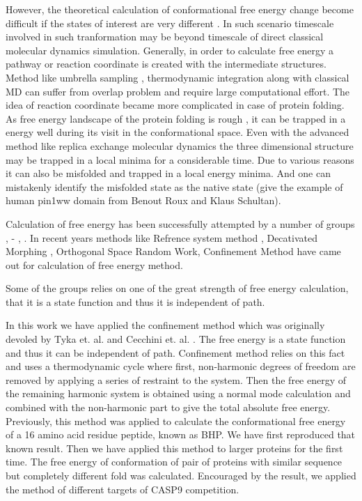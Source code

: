 \documentclass[12pt]{article}
\begin{document}
However, the theoretical calculation of conformational free energy change become difficult if the
states of interest are very different \cite{Meirovitch2007}. In such scenario timescale involved in such tranformation may
be beyond timescale of direct classical molecular dynamics simulation.  Generally, in order to
calculate free energy a pathway or reaction coordinate is created with the intermediate structures.
Method like umbrella sampling \cite{Torrie1977}, thermodynamic integration \cite{Tironi1994} along with classical MD can suffer from
overlap problem and require large computational effort. The idea of reaction coordinate became more
complicated in case of protein folding.  As free energy landscape of the protein folding 
is rough \cite{Dill1997}, \cite{Dill2008}
it can be trapped in a energy well during its visit in the conformational space. Even with the
advanced method like replica exchange molecular dynamics the three dimensional structure may be
trapped in a local minima for a considerable time. Due to various reasons it can also be misfolded
and trapped in a local energy minima. And one can mistakenly identify the misfolded state as the
native state (give the example of human pin1ww domain from Benout Roux and Klaus Schultan).


Calculation of free energy has been successfully attempted by a number of groups \cite{Meirovitch2007}, 
\cite{Ytreberg2006} - \cite{Zheng2008}, . In recent years methods like Refrence system method \cite{Ytreberg2006}, 
Decativated Morphing \cite{Park2008}, Orthogonal Space Random 
Work, Confinement Method have came out for calculation of free energy method. 

Some of the groups
relies on one of the great strength of free energy calculation, that it is a state function and thus
it is independent of path.

In this work we have applied the confinement method which was originally devoled by Tyka et. al. \cite{Tyka2006} and
Cecchini et. al. \cite{Cecchini2009}. The free energy is a state function and thus it can be independent of path. 
Confinement method relies on this fact and uses a thermodynamic cycle where first, non-harmonic degrees of
freedom are removed by applying a series of restraint to the system. Then the free energy of the
remaining harmonic system is obtained using a normal mode calculation and combined with the
non-harmonic part to give the total absolute free energy.  Previously, this method was applied to
calculate the conformational free energy of a 16 amino acid residue peptide, known as BHP.  We have
first reproduced that known result. Then we have applied this method to larger proteins for the
first time. The free energy of conformation of pair of proteins with similar sequence but completely
different fold was calculated. Encouraged by the result, we applied the method of different targets
of CASP9 competition.
\end{document}
